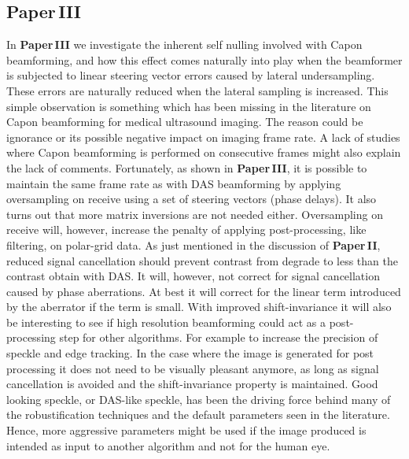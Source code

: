 \subsection{Paper\,III}
In \textbf{Paper\,III} we investigate the inherent self nulling involved with Capon beamforming, and how this effect comes naturally into play when the beamformer is subjected to linear steering vector errors caused by lateral undersampling. These errors are naturally reduced when the lateral sampling is increased. This simple observation is something which has been missing in the literature on Capon beamforming for medical ultrasound imaging. The reason could be ignorance or its possible negative impact on imaging frame rate. A lack of studies where Capon beamforming is performed on consecutive frames might also explain the lack of comments. Fortunately, as shown in \textbf{Paper\,III}, it is possible to maintain the same frame rate as with DAS beamforming by applying oversampling on receive using a set of steering vectors (phase delays). It also turns out that more matrix inversions are not needed either. Oversampling on receive will, however,  increase the penalty of applying post-processing, like filtering,  on polar-grid data. %
As just mentioned in the discussion of \textbf{Paper\,II}, reduced signal cancellation should prevent contrast from degrade to less than the contrast obtain with DAS. It will, however,  not correct for signal cancellation caused by phase aberrations. At best it will correct for the linear term introduced by the aberrator if the term is small.
With improved shift-invariance it will also be interesting to see if high resolution beamforming could act as a post-processing step for other algorithms. For example to increase the precision of speckle and edge tracking. In the case where the image is generated for post processing it does not need to be visually pleasant anymore, as long as signal cancellation is avoided and the shift-invariance property is maintained. Good looking speckle, or DAS-like speckle, has been the driving force behind many of the robustification techniques and the default parameters seen in the literature. Hence, more aggressive parameters might be used if the image produced is intended as input to another algorithm and not for the human eye.

